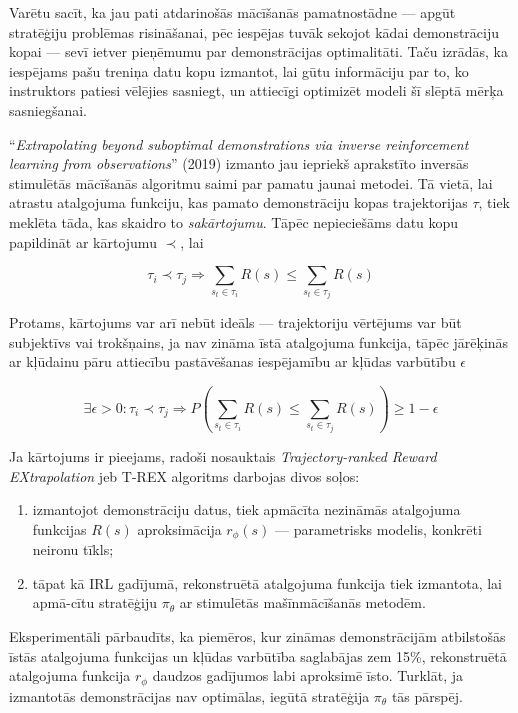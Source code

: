 \documentclass[12pt, a4paper]{article}
\numberwithin{equation}{section} %
\begin{document}
Varētu sacīt, ka jau pati atdarinošās mācīšanās pamatnostādne --- apgūt stratēģiju problēmas risināšanai, pēc iespējas tuvāk sekojot kādai demonstrāciju kopai --- sevī ietver pieņēmumu par demonstrācijas optimalitāti. Taču izrādās, ka iespējams pašu treniņa datu kopu izmantot, lai gūtu informāciju par to, ko instruktors patiesi vēlējies sasniegt, un attiecīgi optimizēt modeli šī slēptā mērķa sasniegšanai.

``\textit{Extrapolating beyond suboptimal demonstrations via inverse reinforcement learning from observations}'' \cite{brown2019extrapolating} (2019) izmanto jau iepriekš aprakstīto inversās stimulētās mācīšanās algoritmu saimi par pamatu jaunai metodei. Tā vietā, lai atrastu atalgojuma funkciju, kas pamato demonstrāciju kopas trajektorijas $\tau$, tiek meklēta tāda, kas skaidro to \textit{sakārtojumu}. Tāpēc nepieciešāms datu kopu papildināt ar kārtojumu $\prec$, lai

\begin{equation}
    \tau_i \prec \tau_j \Rightarrow \sum_{s_t \in \tau_i}R(s) \leq \sum_{s_t \in \tau_j}R(s)
\end{equation}

Protams, kārtojums var arī nebūt ideāls --- trajektoriju vērtējums var būt subjektīvs vai trokšņains, ja nav zināma īstā atalgojuma funkcija, tāpēc jārēķinās ar kļūdainu pāru attiecību pastāvēšanas iespējamību ar kļūdas varbūtību $\epsilon$

\begin{equation}
    \exists \epsilon > 0 : \tau_i \prec \tau_j \Rightarrow P\left(\sum_{s_t \in \tau_i}R(s) \leq \sum_{s_t \in \tau_j}R(s)\right) \geq 1 - \epsilon
\end{equation}

Ja kārtojums ir pieejams, radoši nosauktais \textit{Trajectory-ranked Reward EXtrapolation} jeb T-REX algoritms darbojas divos soļos:

\begin{enumerate}
    \item izmantojot demonstrāciju datus, tiek apmācīta nezināmās atalgojuma funkcijas $R(s)$ aproksimācija $r_{\phi}(s)$ --- parametrisks modelis, konkrēti neironu tīkls;
    \item tāpat kā IRL gadījumā, rekonstruētā atalgojuma funkcija tiek izmantota, lai apmā-cītu stratēģiju $\pi_{\theta}$ ar stimulētās mašīnmācīšanās metodēm.
\end{enumerate}

Eksperimentāli pārbaudīts, ka piemēros, kur zināmas demonstrācijām atbilstošās īstās atalgojuma funkcijas un kļūdas varbūtība saglabājas zem 15\%, rekonstruētā atalgojuma funkcija $r_{\phi}$ daudzos gadījumos labi aproksimē īsto. Turklāt, ja izmantotās demonstrācijas nav optimālas, iegūtā stratēģija $\pi_{\theta}$ tās pārspēj.
\end{document}
